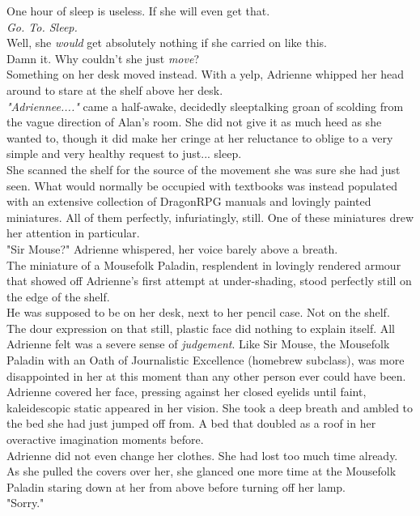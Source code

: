 One hour of sleep is useless.
If she will even get that.\\

\textit{Go. To. Sleep.}\\

Well, she \textit{would} get absolutely nothing if she carried on like this.\\

Damn it. Why couldn't she just \textit{move}?\\

Something on her desk moved instead.
With a yelp, Adrienne whipped her head around to stare at the shelf above her desk.\\

\textit{"Adriennee...."} came a half-awake, decidedly sleeptalking groan of scolding from the vague direction of Alan's room.
She did not give it as much heed as she wanted to, though it did make her cringe at her reluctance to oblige to a very simple and very healthy request to just... sleep.\\

She scanned the shelf for the source of the movement she was sure she had just seen.
What would normally be occupied with textbooks was instead populated with an extensive collection of DragonRPG manuals and lovingly painted miniatures.
All of them perfectly, infuriatingly, still.
One of these miniatures drew her attention in particular.\\

"Sir Mouse?" Adrienne whispered, her voice barely above a breath.\\

The miniature of a Mousefolk Paladin, resplendent in lovingly rendered armour that showed off Adrienne's first attempt at under-shading, stood perfectly still on the edge of the shelf.\\

He was supposed to be on her desk, next to her pencil case. 
Not on the shelf.\\

The dour expression on that still, plastic face did nothing to explain itself. 
All Adrienne felt was a severe sense of \textit{judgement}.
Like Sir Mouse, the Mousefolk Paladin with an Oath of Journalistic Excellence (homebrew subclass), was more disappointed in her at this moment than any other person ever could have been.\\

Adrienne covered her face, pressing against her closed eyelids until faint, kaleidescopic static appeared in her vision.
She took a deep breath and ambled to the bed she had just jumped off from. 
A bed that doubled as a roof in her overactive imagination moments before.\\

Adrienne did not even change her clothes.
She had lost too much time already.\\

As she pulled the covers over her, she glanced one more time at the Mousefolk Paladin staring down at her from above before turning off her lamp.\\

"Sorry."